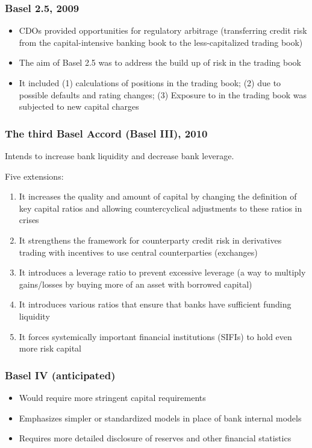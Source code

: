 \subsubsection*{Basel 2.5, 2009}
\begin{itemize}[leftmargin=*]
    \item CDOs provided opportunities for regulatory arbitrage (transferring credit risk from the capital-intensive banking book to the less-capitalized trading book)
    \item The aim of Basel 2.5 was to address the build up of risk in the trading book
    \item It included (1)  calculations of positions in the trading book; (2)
 due to possible defaults and rating changes;
(3) Exposure to  in the trading book was subjected to new capital charges
\end{itemize}



\subsubsection*{The third Basel Accord (Basel III), 2010}
Intends to increase bank liquidity and decrease bank leverage.

Five extensions:
\begin{enumerate}[label = (\arabic*), leftmargin=*]
    \item It increases the quality and amount of capital by changing the definition of key capital ratios and allowing countercyclical adjustments to these ratios in crises
    \item It strengthens the framework for counterparty credit risk in derivatives trading with incentives to
use central counterparties (exchanges)
    \item It introduces a leverage ratio to prevent excessive leverage (a way to multiply gains/losses by
buying more of an asset with borrowed capital)
    \item It introduces various ratios that ensure that banks have sufficient funding liquidity
    \item It forces systemically important financial institutions (SIFIs) to hold even more risk capital
\end{enumerate}


\subsubsection*{Basel IV (anticipated)}
\begin{itemize}[leftmargin=*]
    \item Would require more stringent capital requirements
    \item Emphasizes simpler or standardized models in place of bank internal models
    \item Requires more detailed disclosure of reserves and other financial statistics
\end{itemize}




